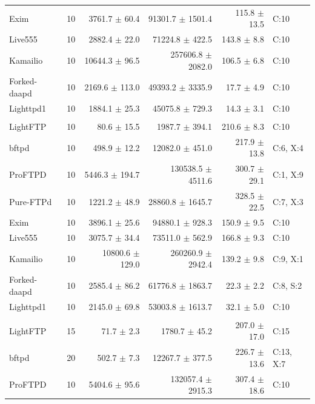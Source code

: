 \begin{minipage}[t]{0.49\linewidth}
\begin{tabular}{@{}lrrrrl@{}}
Exim & 10 & 3761.7 $\pm$ 60.4 & 91301.7 $\pm$ 1501.4 & 115.8 $\pm$ 13.5 & C:10 \\
Live555 & 10 & 2882.4 $\pm$ 22.0 & 71224.8 $\pm$ 422.5 & 143.8 $\pm$ 8.8 & C:10 \\
Kamailio & 10 & 10644.3 $\pm$ 96.5 & 257606.8 $\pm$ 2082.0 & 106.5 $\pm$ 6.8 & C:10 \\
Forked-daapd & 10 & 2169.6 $\pm$ 113.0 & 49393.2 $\pm$ 3335.9 & 17.7 $\pm$ 4.9 & C:10 \\
Lighttpd1 & 10 & 1884.1 $\pm$ 25.3 & 45075.8 $\pm$ 729.3 & 14.3 $\pm$ 3.1 & C:10 \\
\addlinespace[2pt]
\multicolumn{6}{@{}l}{\textbf{C -- Direct admission}}\\
LightFTP & 10 & 80.6 $\pm$ 15.5 & 1987.7 $\pm$ 394.1 & 210.6 $\pm$ 8.3 & C:10 \\
bftpd & 10 & 498.9 $\pm$ 12.2 & 12082.0 $\pm$ 451.0 & 217.9 $\pm$ 13.8 & C:6, X:4 \\
ProFTPD & 10 & 5446.3 $\pm$ 194.7 & 130538.5 $\pm$ 4511.6 & 300.7 $\pm$ 29.1 & C:1, X:9 \\
Pure-FTPd & 10 & 1221.2 $\pm$ 48.9 & 28860.8 $\pm$ 1645.7 & 328.5 $\pm$ 22.5 & C:7, X:3 \\
Exim & 10 & 3896.1 $\pm$ 25.6 & 94880.1 $\pm$ 928.3 & 150.9 $\pm$ 9.5 & C:10 \\
Live555 & 10 & 3075.7 $\pm$ 34.4 & 73511.0 $\pm$ 562.9 & 166.8 $\pm$ 9.3 & C:10 \\
Kamailio & 10 & 10800.6 $\pm$ 129.0 & 260260.9 $\pm$ 2942.4 & 139.2 $\pm$ 9.8 & C:9, X:1 \\
Forked-daapd & 10 & 2585.4 $\pm$ 86.2 & 61776.8 $\pm$ 1863.7 & 22.3 $\pm$ 2.2 & C:8, S:2 \\
Lighttpd1 & 10 & 2145.0 $\pm$ 69.8 & 53003.8 $\pm$ 1613.7 & 32.1 $\pm$ 5.0 & C:10 \\
\addlinespace[2pt]
\multicolumn{6}{@{}l}{\textbf{D -- Gated fixed}}\\
LightFTP & 15 & 71.7 $\pm$ 2.3 & 1780.7 $\pm$ 45.2 & 207.0 $\pm$ 17.0 & C:15 \\
bftpd & 20 & 502.7 $\pm$ 7.3 & 12267.7 $\pm$ 377.5 & 226.7 $\pm$ 13.6 & C:13, X:7 \\
ProFTPD & 10 & 5404.6 $\pm$ 95.6 & 132057.4 $\pm$ 2915.3 & 307.4 $\pm$ 18.6 & C:10 \\
\bottomrule
\end{tabular}
\end{minipage}\hfill%
